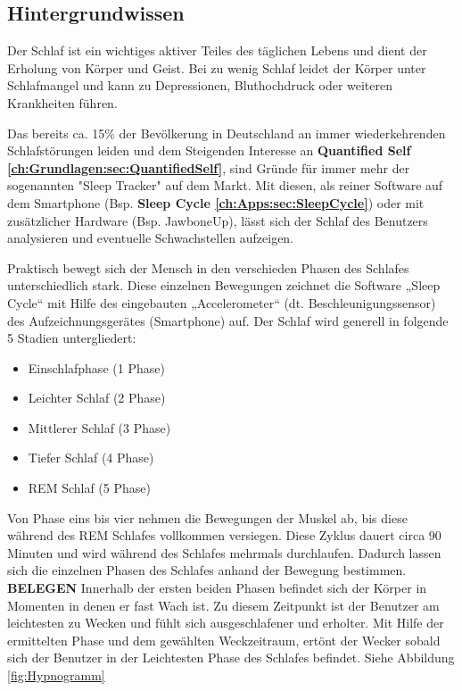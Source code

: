 \subsection{Hintergrundwissen}
\label{ch:Apps:sec:Sleepcycle:subsec:H}

Der Schlaf ist ein wichtiges aktiver Teiles des täglichen Lebens und dient der Erholung von Körper und Geist.
Bei zu wenig Schlaf leidet der Körper unter Schlafmangel und kann zu Depressionen, Bluthochdruck oder weiteren Krankheiten führen. \cite{Chen:SleepMonitoring}

Das bereits ca. 15\% der Bevölkerung in Deutschland an immer wiederkehrenden Schlafstörungen leiden und dem Steigenden Interesse an \textbf{Quantified Self \ref{ch:Grundlagen:sec:QuantifiedSelf}}, sind Gründe für immer mehr der sogenannten "Sleep Tracker" auf dem Markt. %
Mit diesen, als reiner Software auf dem Smartphone (Bsp. \textbf{Sleep Cycle \ref{ch:Apps:sec:SleepCycle}}) oder mit zusätzlicher Hardware (Bsp. JawboneUp), lässt sich der Schlaf des Benutzers analysieren und eventuelle Schwachstellen aufzeigen.

Praktisch bewegt sich der Mensch in den verschieden Phasen des Schlafes unterschiedlich stark.
Diese einzelnen Bewegungen zeichnet die Software „Sleep Cycle“ mit Hilfe des eingebauten „Accelerometer“ (dt. Beschleunigungssensor) des Aufzeichnungsgerätes (Smartphone) auf.
Der Schlaf wird generell in folgende 5 Stadien untergliedert:

\begin{itemize}
	\item Einschlafphase (1 Phase)
	\item Leichter Schlaf (2 Phase)
	\item Mittlerer Schlaf (3 Phase)
	\item Tiefer Schlaf (4 Phase)
	\item REM Schlaf (5 Phase)
\end{itemize}

Von Phase eins bis vier nehmen die Bewegungen der Muskel ab, bis diese während des REM Schlafes vollkommen versiegen.
Diese Zyklus dauert circa 90 Minuten und wird während des Schlafes mehrmals durchlaufen.
Dadurch lassen sich die einzelnen Phasen des Schlafes anhand der Bewegung bestimmen. \textbf{BELEGEN}
Innerhalb der ersten beiden Phasen befindet sich der Körper in Momenten in denen er fast Wach ist. Zu diesem Zeitpunkt ist der Benutzer am leichtesten zu Wecken und fühlt sich ausgeschlafener und erholter.
Mit Hilfe der ermittelten Phase und dem gewählten Weckzeitraum, ertönt der Wecker sobald sich der Benutzer in der Leichtesten Phase des Schlafes befindet. Siehe Abbildung \ref{fig:Hypnogramm}


